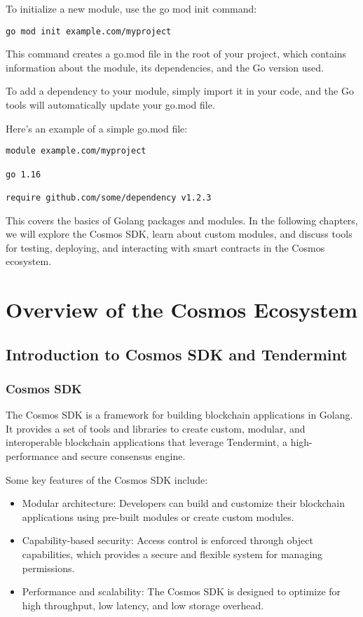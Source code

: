 \documentclass{article}
\begin{document}
To initialize a new module, use the go mod init command:

\begin{verbatim}
go mod init example.com/myproject
\end{verbatim}

This command creates a go.mod file in the root of your project, which contains information about the module, its dependencies, and the Go version used.

To add a dependency to your module, simply import it in your code, and the Go tools will automatically update your go.mod file.

Here's an example of a simple go.mod file:

\begin{verbatim}
module example.com/myproject

go 1.16

require github.com/some/dependency v1.2.3
\end{verbatim}

This covers the basics of Golang packages and modules. In the following chapters, we will explore the Cosmos SDK, learn about custom modules, and discuss tools for testing, deploying, and interacting with smart contracts in the Cosmos ecosystem.
%
%
\section{Overview of the Cosmos Ecosystem}

\subsection{Introduction to Cosmos SDK and Tendermint}

\subsubsection{Cosmos SDK}

The Cosmos SDK is a framework for building blockchain applications in Golang. It provides a set of tools and libraries to create custom, modular, and interoperable blockchain applications that leverage Tendermint, a high-performance and secure consensus engine.

Some key features of the Cosmos SDK include:

\begin{itemize}
\item Modular architecture: Developers can build and customize their blockchain applications using pre-built modules or create custom modules.
\item Capability-based security: Access control is enforced through object capabilities, which provides a secure and flexible system for managing permissions.
\item Performance and scalability: The Cosmos SDK is designed to optimize for high throughput, low latency, and low storage overhead.
\end{itemize}
\end{document}
